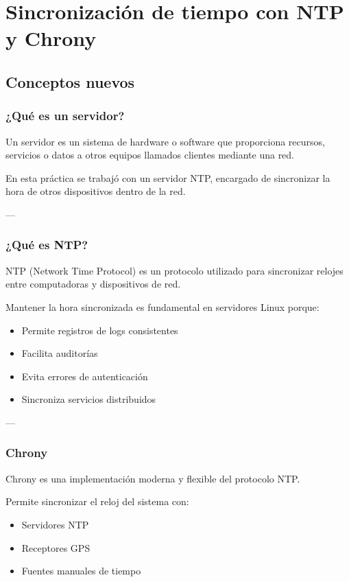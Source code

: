 \documentclass[11pt, letterpaper]{article}
\begin{document}
\section{Sincronización de tiempo con NTP y Chrony}
\label{sec:org75a362f}

\subsection{Conceptos nuevos}
\label{sec:org72dc1dc}

\subsubsection{¿Qué es un servidor?}
\label{sec:org825dedd}

Un servidor es un sistema de hardware o software que proporciona recursos, servicios o datos a otros equipos llamados clientes mediante una red.

En esta práctica se trabajó con un servidor NTP, encargado de sincronizar la hora de otros dispositivos dentro de la red.

---
\subsubsection{¿Qué es NTP?}
\label{sec:orgfe15c5b}

NTP (Network Time Protocol) es un protocolo utilizado para sincronizar relojes entre computadoras y dispositivos de red.

Mantener la hora sincronizada es fundamental en servidores Linux porque:

\begin{itemize}
\item Permite registros de logs consistentes
\item Facilita auditorías
\item Evita errores de autenticación
\item Sincroniza servicios distribuidos
\end{itemize}

---
\subsubsection{Chrony}
\label{sec:org1014d01}

Chrony es una implementación moderna y flexible del protocolo NTP.

Permite sincronizar el reloj del sistema con:

\begin{itemize}
\item Servidores NTP
\item Receptores GPS
\item Fuentes manuales de tiempo
\end{itemize}
\end{document}
